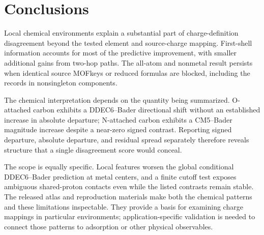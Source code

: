 \section{Conclusions}
Local chemical environments explain a substantial part of charge-definition disagreement beyond the tested element and source-charge mapping. First-shell information accounts for most of the predictive improvement, with smaller additional gains from two-hop paths. The all-atom and nonmetal result persists when identical source MOFkeys or reduced formulas are blocked, including the records in nonsingleton components.

The chemical interpretation depends on the quantity being summarized. O-attached carbon exhibits a DDEC6--Bader directional shift without an established increase in absolute departure; N-attached carbon exhibits a CM5--Bader magnitude increase despite a near-zero signed contrast. Reporting signed departure, absolute departure, and residual spread separately therefore reveals structure that a single disagreement score would conceal.

The scope is equally specific. Local features worsen the global conditional DDEC6--Bader prediction at metal centers, and a finite cutoff test exposes ambiguous shared-proton contacts even while the listed contrasts remain stable. The released atlas and reproduction materials make both the chemical patterns and these limitations inspectable. They provide a basis for examining charge mappings in particular environments; application-specific validation is needed to connect those patterns to adsorption or other physical observables.
